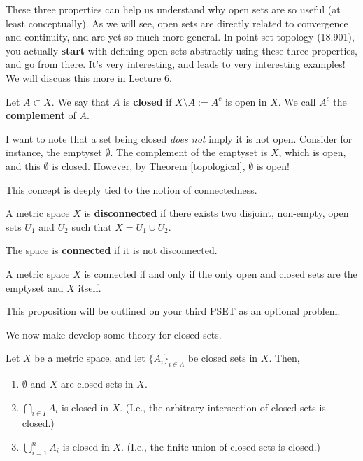 \begin{remark}
These three properties can help us understand why open sets are so useful (at least conceptually). As we will see, open sets are directly related to convergence and continuity, and are yet so much more general. In point-set topology (18.901), you actually \textbf{start} with defining open sets abstractly using these three properties, and go from there. It's very interesting, and leads to very interesting examples! We will discuss this more in Lecture 6.
\end{remark}

\begin{definition}
Let $A\subset X$. We say that $A$ is \textbf{closed} if $X\setminus A := A^c$ is open in $X$. We call $A^c$ the \textbf{complement} of $A$.
\end{definition}

I want to note that a set being closed \textit{does not} imply it is not open. Consider for instance, the emptyset $\emptyset$. The complement of the emptyset is $X$, which is open, and this $\emptyset$ is closed. However, by Theorem \ref{topological}, $\emptyset$ is open!

This concept is deeply tied to the notion of connectedness.

\begin{definition}
    A metric space $X$ is \textbf{disconnected} if there exists two disjoint, non-empty, open sets $U_1$ and $U_2$ such that $X = U_1 \cup U_2$.

    The space is \textbf{connected} if it is not disconnected.
\end{definition}

\begin{proposition}
    A metric space $X$ is connected if and only if the only open and closed sets are the emptyset and $X$ itself.
\end{proposition}

\begin{remark}
    This proposition will be outlined on your third PSET as an optional problem.
\end{remark}

We now make develop some theory for closed sets.

\begin{theorem}
Let $X$ be a metric space, and let $\{A_i\}_{i\in \Lambda}$ be closed sets in $X$. Then,
\begin{enumerate}
    \item $\emptyset$ and $X$ are closed sets in $X.$
    \item $\bigcap_{i\in I} A_i$ is closed in $X$. (I.e., the arbitrary intersection of closed sets is closed.)
    \item $\bigcup_{i=1}^n A_i$ is closed in $X$. (I.e., the finite union of closed sets is closed.)
\end{enumerate}
\end{theorem}

